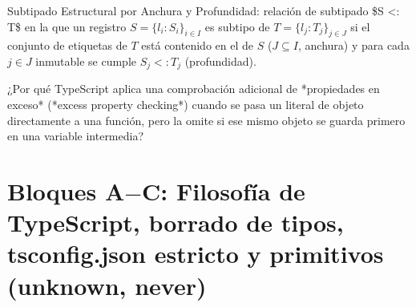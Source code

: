 \documentclass{book}
\begin{document}
\begin{tcolorbox}[title={Definición}, studiumdef, breakable]

Subtipado Estructural por Anchura y Profundidad: relación de subtipado \$S <: T\$ en la que un registro \(S = \{ l_i : S_i \}_{i \in I}\) es subtipo de \(T = \{ l_j : T_j \}_{j \in J}\) si el conjunto de etiquetas de \(T\) está contenido en el de \(S\) (\(J \subseteq I\), anchura) y para cada \(j \in J\) inmutable se cumple \(S_j <: T_j\) (profundidad).
\end{tcolorbox}

\begin{tcolorbox}[title={Autoficha}, studiumcheck, breakable]

¿Por qué TypeScript aplica una comprobación adicional de *propiedades en exceso* (*excess property checking*) cuando se pasa un literal de objeto directamente a una función, pero la omite si ese mismo objeto se guarda primero en una variable intermedia?
\end{tcolorbox}

\section{Bloques A\(-\)C: Filosofía de TypeScript, borrado de tipos, tsconfig.json estricto y primitivos (unknown, never)}
\end{document}
